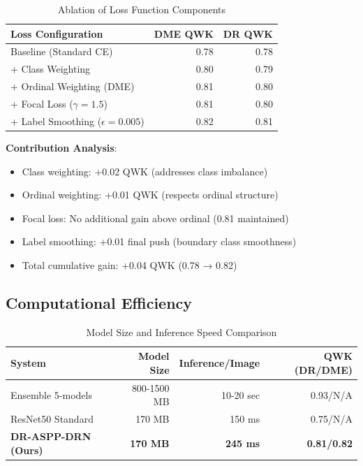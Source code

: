 \begin{table}[H]
\centering
\small
\caption{Ablation of Loss Function Components}
\begin{tabular}{|p{3.5cm}|r|r|}
\hline
\textbf{Loss Configuration} & \textbf{DME QWK} & \textbf{DR QWK} \\
\hline
Baseline (Standard CE) & 0.78 & 0.78 \\
+ Class Weighting & 0.80 & 0.79 \\
+ Ordinal Weighting (DME) & 0.81 & 0.80 \\
+ Focal Loss ($\gamma=1.5$)  & 0.81 & 0.80 \\
+ Label Smoothing ($\epsilon=0.005$) & 0.82 & 0.81 \\
\hline
\end{tabular}
\end{table}

\textbf{Contribution Analysis}:
\begin{itemize}
    \item Class weighting: +0.02 QWK (addresses class imbalance)
    \item Ordinal weighting: +0.01 QWK (respects ordinal structure)
    \item Focal loss: No additional gain above ordinal (0.81 maintained)
    \item Label smoothing: +0.01 final push (boundary class smoothness)
    \item Total cumulative gain: +0.04 QWK (0.78 → 0.82)
\end{itemize}

\subsection{Computational Efficiency}

\begin{table}[H]
\centering
\small
\caption{Model Size and Inference Speed Comparison}
\begin{tabular}{|l|r|r|r|}
\hline
\textbf{System} & \textbf{Model Size} & \textbf{Inference/Image} & \textbf{QWK (DR/DME)} \\
\hline
Ensemble 5-models & 800-1500 MB & 10-20 sec & 0.93/N/A \\
ResNet50 Standard & 170 MB & 150 ms & 0.75/N/A \\
\textbf{DR-ASPP-DRN (Ours)} & \textbf{170 MB} & \textbf{245 ms} & \textbf{0.81/0.82} \\
\hline
\end{tabular}
\end{table}

